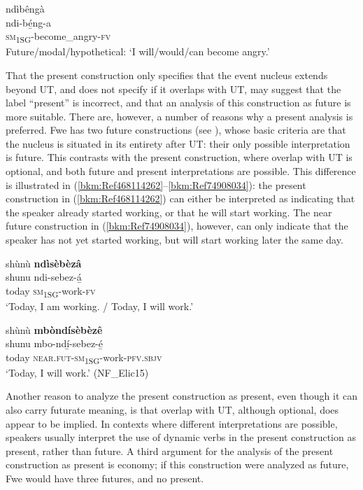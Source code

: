 \ea
\label{bkm:Ref75248605}
ndìbêngà\\
ndi-bé̲ng-a\\
\textsc{sm}\textsubscript{1SG}-become\_angry-\textsc{fv}\\
Future/modal/hypothetical: ‘I will/would/can become angry.’
\z

That the present construction only specifies that the event nucleus extends beyond UT, and does not specify if it overlaps with UT, may suggest that the label “present” is incorrect, and that an analysis of this construction as future is more suitable. There are, however, a number of reasons why a present analysis is preferred. Fwe has two future constructions (see ), whose basic criteria are that the nucleus is situated in its entirety after UT: their only possible interpretation is future. This contrasts with the present construction, where overlap with UT is optional, and both future and present interpretations are possible. This difference is illustrated in (\ref{bkm:Ref468114262}--\ref{bkm:Ref74908034}): the present construction in (\ref{bkm:Ref468114262}) can either be interpreted as indicating that the speaker already started working, or that he will start working. The near future construction in (\ref{bkm:Ref74908034}), however, can only indicate that the speaker has not yet started working, but will start working later the same day.

\ea
\label{bkm:Ref468114262}
shùnù \textbf{ndìsèbèzâ}\\
\gll shunu  ndi-sebez-á̲\\
today  \textsc{sm}\textsubscript{1SG}-work-\textsc{fv}\\
\glt ‘Today, I am working. / Today, I will work.’
\z

\ea
\label{bkm:Ref74908034}
shùnù \textbf{mbòndísèbèzê}\\
\gll shunu  mbo-ndí̲-sebez-é̲\\
today  \textsc{near}.\textsc{fut}-\textsc{sm}\textsubscript{1SG}-work-\textsc{pfv}.\textsc{sbjv}\\
\glt ‘Today, I will work.’ (NF\_Elic15)
\z

Another reason to analyze the present construction as present, even though it can also carry futurate meaning, is that overlap with UT, although optional, does appear to be implied. In contexts where different interpretations are possible, speakers usually interpret the use of dynamic verbs in the present construction as present, rather than future. A third argument for the analysis of the present construction as present is economy; if this construction were analyzed as future, Fwe would have three futures, and no present.

